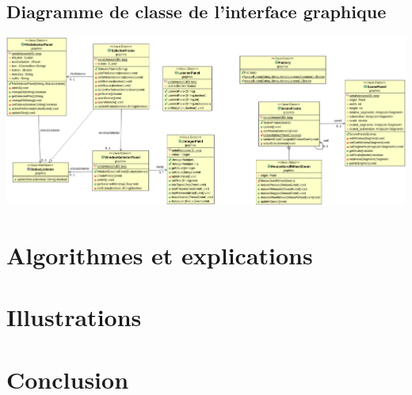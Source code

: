 \documentclass[10pt,a4paper]{article}
\begin{document}
\subsection{Diagramme de classe de l'interface graphique}
\includegraphics[scale=0.25]{images/graphics.png}

\section{Algorithmes et explications}

\section{Illustrations}

\section{Conclusion}
\end{document}
